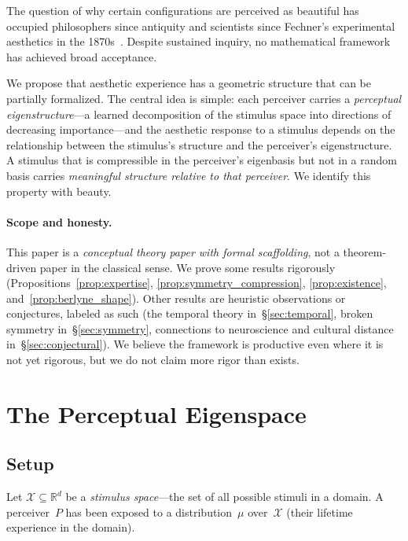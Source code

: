 \documentclass[journal]{IEEEtran}
\theoremstyle{definition}
\theoremstyle{remark}
\newcommand{\R}{\mathbb{R}}
\begin{document}
The question of why certain configurations are perceived as beautiful
has occupied philosophers since antiquity and scientists since
Fechner's experimental aesthetics in the 1870s~\cite{fechner1876vorschule}.
Despite sustained inquiry, no mathematical framework has achieved broad
acceptance.

We propose that aesthetic experience has a geometric structure that
can be partially formalized.  The central idea is simple: each
perceiver carries a \emph{perceptual eigenstructure}---a learned
decomposition of the stimulus space into directions of decreasing
importance---and the aesthetic response to a stimulus depends on the
relationship between the stimulus's structure and the perceiver's
eigenstructure.  A stimulus that is compressible in the perceiver's
eigenbasis but not in a random basis carries \emph{meaningful
structure relative to that perceiver}.  We identify this property
with beauty.

\paragraph{Scope and honesty.}
This paper is a \emph{conceptual theory paper with formal
scaffolding}, not a theorem-driven paper in the classical sense.
We prove some results rigorously
(Propositions~\ref{prop:expertise}, \ref{prop:symmetry_compression},
\ref{prop:existence}, and~\ref{prop:berlyne_shape}).
Other results are heuristic observations or conjectures, labeled
as such (the temporal theory in~\S\ref{sec:temporal}, broken
symmetry in~\S\ref{sec:symmetry}, connections to neuroscience
and cultural distance in~\S\ref{sec:conjectural}).  We believe the framework is
productive even where it is not yet rigorous, but we do not claim
more rigor than exists.


\section{The Perceptual Eigenspace}
\label{sec:eigenspace}

\subsection{Setup}

Let $\mathcal{X} \subseteq \R^d$ be a \emph{stimulus space}---the
set of all possible stimuli in a domain.  A perceiver~$P$ has been
exposed to a distribution~$\mu$ over~$\mathcal{X}$ (their lifetime
experience in the domain).
\end{document}
